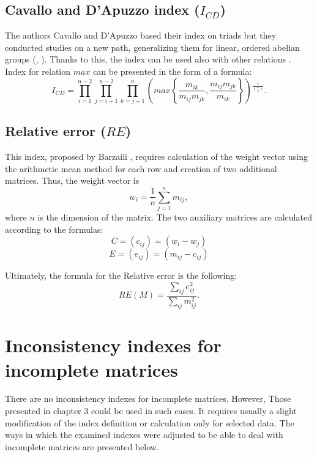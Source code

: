 \subsection{Cavallo and D’Apuzzo index ($I_{CD}$)}

The authors Cavallo and D'Apuzzo based their index on triads but they conducted studies on a new path, generalizing them for linear, ordered abelian groups (\cite{Cavallo2009}, \cite{Cavallo2010}). Thanks to this, the index can be used also with other relations \cite{Brunelli2013}. Index for relation $max$ can be presented in the form of a formula:
	\begin{equation} 
		\label{eq:CavDAp}
		I_{CD}=\prod_{i=1}^{n-2}\prod_{j=i+1}^{n-2}\prod_{k=j+1}^{n}\left(max\left\{ \frac{m_{ik}}{m_{ij}m_{jk}},\frac{m_{ij}m_{jk}}{m_{ik}}\right\} \right){}^{\frac{1}{\binom{n}{3}}}.
	 \end{equation}
 

\subsection{Relative error ($RE$)}

This index, proposed by Barzaili \cite{Jonathan1998}, requires calculation of the weight vector using the arithmetic mean method for each row and creation of two additional matrices. Thus, the weight vector is $$w_{i}=\frac{1}{n}\sum_{j=1}^{n}m_{ij},$$ where $n$ is the dimension of the matrix. The two auxiliary matrices are calculated according to the formulas:
$$C=\left(c_{ij}\right)=\left(w_{i}-w_{j}\right)$$
$$E=\left(e_{ij}\right)=\left(m_{ij}-c_{ij}\right)$$

Ultimately, the formula for the Relative error is the following:
	\begin{equation} 
		RE(M)=\frac{\sum_{ij}e_{ij}^{2}}{\sum_{ij}m_{ij}^{2}}.
	 \end{equation}


\section{Inconsistency indexes for incomplete matrices}
\label{sec:inconsistencyIndexesForIncompleteMatrices}

There are no inconsistency indexes for incomplete matrices. However, Those presented in chapter 3 could be used in such cases. It requires usually a slight modification of the index definition or calculation only for selected data. The ways in which the examined indexes were adjusted to be able to deal with incomplete matrices are presented below.

